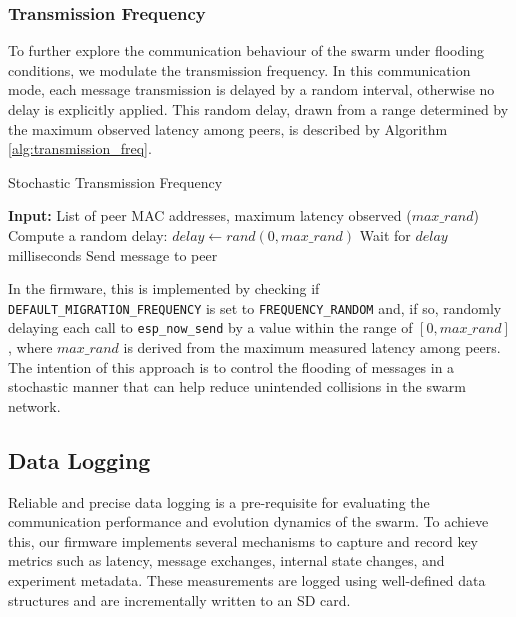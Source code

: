 \documentclass[conference]{IEEEtran}
\begin{document}
\subsubsection{Transmission Frequency}\label{sec:transmission-frequency}

To further explore the communication behaviour of the swarm under flooding conditions, we modulate the transmission frequency. In this communication mode, each message transmission is delayed by a random interval, otherwise no delay is explicitly applied. This random delay, drawn from a range determined by the maximum observed latency among peers, is described by Algorithm \ref{alg:transmission_freq}.\\

\begin{algorithm}[H]
\caption{Stochastic Transmission Frequency}
\label{alg:transmission_freq}
\begin{algorithmic}[1]
\State \textbf{Input:} List of peer MAC addresses, maximum latency observed ($max\_rand$)
        \State Compute a random delay: $delay \gets rand(0, max\_rand)$
        \State Wait for $delay$ milliseconds
        \State Send message to peer
    \EndIf
\EndFor
\end{algorithmic}
\end{algorithm}

In the firmware, this is implemented by checking if \texttt{DEFAULT\_MIGRATION\_FREQUENCY} is set to \texttt{FREQUENCY\_RANDOM} and, if so, randomly delaying each call to \texttt{esp\_now\_send} by a value within the range of $[0, max\_rand]$, where $max\_rand$ is derived from the maximum measured latency among peers. The intention of this approach is to control the flooding of messages in a stochastic manner that can help reduce unintended collisions in the swarm network.

\subsection{Data Logging}\label{sec:data-logging}

Reliable and precise data logging is a pre-requisite for evaluating the communication performance and evolution dynamics of the swarm. To achieve this, our firmware implements several mechanisms to capture and record key metrics such as latency, message exchanges, internal state changes, and experiment metadata. These measurements are logged using well-defined data structures and are incrementally written to an SD card.\\
\end{document}
